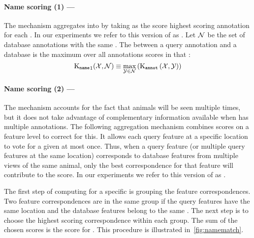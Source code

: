         \paragraph{Name scoring (1) --- \csumprefix{}} %

            The \cscoring{} mechanism aggregates \annotscores{} into \namescores{} by taking as the score highest
              scoring annotation for each \name{}.
            In our experiments we refer to this version of \namescoring{} as \csum{}.
            Let $\mathcal{N}$ be the set of database annotations with the same \name{}.
            The \cscore{} between a query annotation and a database \name{} is the maximum over all annotations
              scores in that \name{}:
            \begin{equation}
                \operatorname{K_{\tt name}}_1(\mathcal{X}, \mathcal{N}) 
                \equiv
                \max_{\mathcal{Y} \in \mathcal{N}}
                \left(
                    \operatorname{K_{\tt annot}}\left(\mathcal{X}, \mathcal{Y}\right)
                \right)
            \end{equation}

         \paragraph{Name scoring (2) --- \nsumprefix{}} %
            The \cscoring{} mechanism accounts for the fact that animals will be seen multiple times, but it does
              not take advantage of complementary information available when \aan{\name{}} has multiple
              annotations.
            The following aggregation mechanism combines scores on a feature level to correct for this.
            It allows each query feature at a specific location to vote for a given \name{} at most once.
            Thus, when a query feature (or multiple query features at the same location) corresponds to database
              features from multiple views of the same animal, only the best correspondence for that feature will
              contribute to the score.
            In our experiments we refer to this version of \namescoring{} as \nsum{}.

            The first step of computing \aan{\namescore{}} for a specific \name{} is grouping the feature
              correspondences.
            Two feature correspondences are in the same group if the query features have the same location and
              the database features belong to the same \name{}.
            The next step is to choose the highest scoring correspondence within each group.
            The sum of the chosen scores is the score for \aan{\name{}}.
            This procedure is illustrated in~\cref{fig:namematch}.

